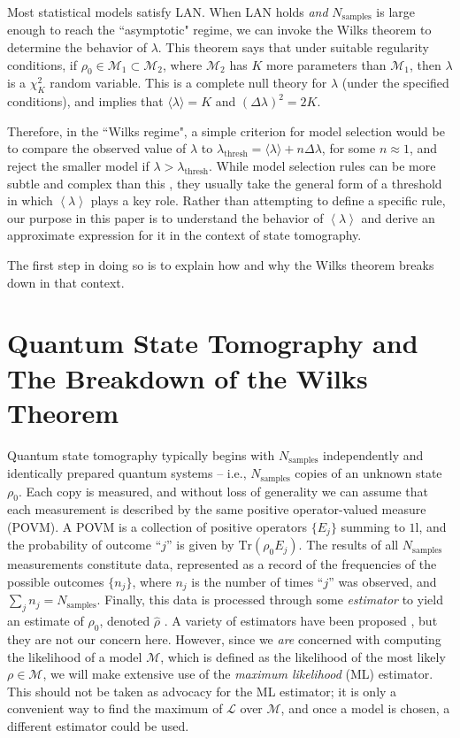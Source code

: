 \documentclass[aps,pra, twocolumn]{revtex4-1}
\newcommand{\M}{\mathcal{M}}
\newcommand{\Tr}{\mathrm{Tr}}
\newcommand{\cL}{\mathcal{L}}
\newcommand{\Id}{\mathbb{I}}
\newcommand{\expect}[1]{\ensuremath{\left\langle#1\right\rangle}}
\def\Id{1\!\mathrm{l}}
\begin{document}
Most statistical models satisfy LAN.  When LAN holds \emph{and} $N_{\mathrm{samples}}$ is large enough to reach the ``asymptotic" regime, we can invoke the Wilks theorem to determine the behavior of $\lambda$. This theorem says that under suitable regularity conditions, if $\rho_{0}\in \M_{1}\subset \M_{2}$, where $\M_{2}$ has $K$ more parameters than $\M_{1}$, then $\lambda$ is a $\chi^{2}_{K}$ random variable.  This is a complete null theory for $\lambda$ (under the specified conditions), and implies that $\langle \lambda \rangle = K$ and $(\Delta \lambda)^{2} = 2K$.

Therefore, in the ``Wilks regime", a simple criterion for model selection would be to compare the observed value of $\lambda$ to $\lambda_{\mathrm{thresh}} = \langle \lambda \rangle + n\Delta \lambda$, for some $n \approx 1$, and reject the smaller model if $\lambda > \lambda_{\mathrm{thresh}}$.  While model selection rules can be more subtle and complex than this \cite{Akaike1974, Schwarz1978, Kass1995, Spiegelhalter2002}, they usually take the general form of a threshold in which $\expect{\lambda}$ plays a key role.  Rather than attempting to define a specific rule, our purpose in this paper is to understand the behavior of $\expect{\lambda}$ and derive an approximate expression for it in the context of state tomography.

The first step in doing so is to explain how and why the Wilks theorem breaks down in that context.

\section{Quantum State Tomography and The Breakdown of the Wilks Theorem}
\label{sec:qstmodelselection}
Quantum state tomography typically begins with $N_{\mathrm{samples}}$ independently and identically prepared quantum systems -- i.e., $N_{\mathrm{samples}}$ copies of an unknown state $\rho_{0}$.  Each copy is measured, and without loss of generality we can assume that each measurement is described by the same positive operator-valued measure (POVM).  A POVM is a collection of positive operators $\{E_j\}$ summing to $\Id$, and the probability of outcome ``$j$'' is given by $\Tr(\rho_0 E_j)$.  The results of all $N_{\mathrm{samples}}$ measurements constitute data, represented as a record of the frequencies of the possible outcomes $\{n_{j}\}$, where $n_{j}$ is the number of times ``$j$'' was observed, and $\sum_{j}n_{j} = N_{\mathrm{samples}}$.  Finally, this data is processed through some \emph{estimator} to yield an estimate of $\rho_0$, denoted $\hat{\rho}$ .  A variety of estimators have been proposed \cite{Vogel1989,Hradil1997,JamesPRA2001,Blume-Kohout2010b,Blume-Kohout2010,Zhu2014a,Ferrie2016}, but they are not our concern here.  However, since we \emph{are} concerned with computing the likelihood of a model $\M$, which is defined as the likelihood of the most likely $\rho\in\M$, we will make extensive use of the \emph{maximum likelihood} (ML) estimator.  This should not be taken as advocacy for the ML estimator; it is only a convenient way to find the maximum of $\cL$ over $\M$, and once a model is chosen, a different estimator could be used.
\end{document}
